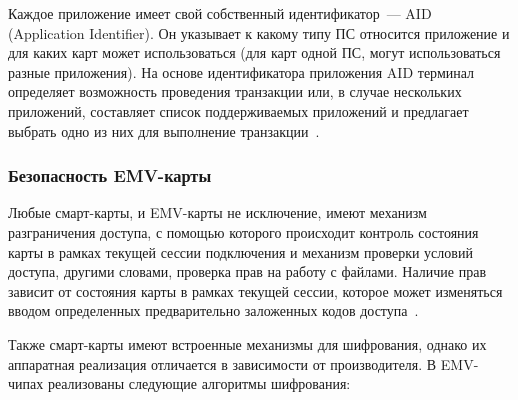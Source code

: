 Каждое приложение имеет свой собственный идентификатор~--- AID (Application Identifier).
Он указывает к какому типу ПС относится приложение и для каких карт может использоваться (для карт одной ПС, могут использоваться разные приложения).
На основе идентификатора приложения AID терминал определяет возможность проведения транзакции или, в случае нескольких приложений, составляет список поддерживаемых приложений и предлагает выбрать одно из них для выполнение транзакции~\cite{emv_card_mechanism}.

\subsubsection{Безопасность EMV-карты}

Любые смарт-карты, и EMV-карты не исключение, имеют механизм разграничения доступа, с помощью которого происходит контроль состояния карты в рамках текущей сессии подключения и механизм проверки условий доступа, другими словами, проверка прав на работу с файлами.
Наличие прав зависит от состояния карты в рамках текущей сессии, которое может изменяться вводом определенных предварительно заложенных кодов доступа~\cite{habr_smart_card_for_little}.

Также смарт-карты имеют встроенные механизмы для шифрования, однако их аппаратная реализация отличается в зависимости от производителя.
В EMV-чипах реализованы следующие алгоритмы шифрования:

